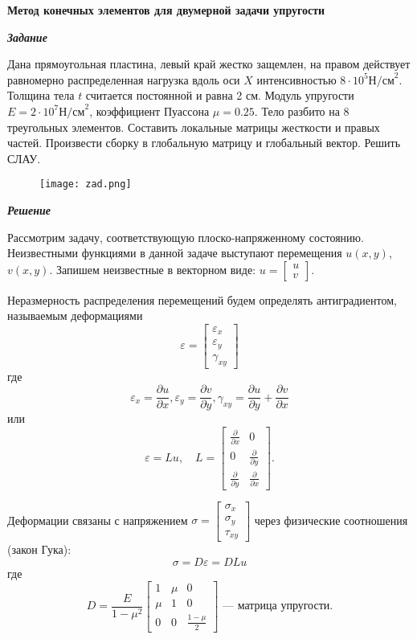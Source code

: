 \documentclass[a4paper, 12pt]{article}
\begin{document}
\begin{center}
	\textbf{Метод конечных элементов для двумерной задачи упругости}

	\textbf{\textit{Задание}}
\end{center}

Дана прямоугольная пластина, левый край жестко защемлен, на правом действует равномерно распределенная нагрузка вдоль оси $X$ интенсивностью  $8\cdot 10^5 \text{Н/см}^2$. Толщина тела $t$ считается постоянной и равна 2 см. Модуль упругости  $E=2\cdot 10^7 \text{Н/см}^2$, коэффициент Пуассона $\mu=0.25$. Тело разбито на 8 треугольных элементов. Составить локальные матрицы жесткости и правых частей. Произвести сборку в глобальную матрицу и глобальный вектор. Решить СЛАУ.

\begin{figure}[h]
	\centering
\texttt{[image: zad.png]}
\end{figure} 


\begin{center}
	\textit{\textbf{Решение}}
\end{center}

Рассмотрим задачу, соответствующую плоско-напряженному состоянию.  
Неизвестными функциями в данной задаче выступают перемещения \(u(x,y)\), \(v(x,y)\).  
Запишем неизвестные в векторном виде: \(u = \begin{bmatrix} u \\ v \end{bmatrix}\).

Неразмерность распределения перемещений будем определять антиградиентом, называемым деформациями 
\[
\varepsilon = \begin{bmatrix} \varepsilon_x \\ \varepsilon_y \\ \gamma_{xy} \end{bmatrix}
\]
где 
\[\varepsilon_x = \frac{\partial u}{\partial x}, \varepsilon_y = \frac{\partial v}{\partial y}, \gamma_{xy} = \frac{\partial u}{\partial y} + \frac{\partial v}{\partial x}
\]
или
\[
\varepsilon = L u, \quad L = 
\begin{bmatrix}
	\frac{\partial}{\partial x} & 0 \\
	0 & \frac{\partial}{\partial y} \\
	\frac{\partial}{\partial y} & \frac{\partial}{\partial x}
\end{bmatrix}.
\]

Деформации связаны с напряжением \(\sigma = \begin{bmatrix} \sigma_x \\ \sigma_y \\ \tau_{xy} \end{bmatrix}\) через физические соотношения (закон Гука): 
\[
\sigma = D \varepsilon = D L u
\]
где
\[
D = \frac{E}{1 - \mu^2}
\begin{bmatrix}
	1 & \mu & 0 \\
	\mu & 1 & 0 \\
	0 & 0 & \frac{1-\mu}{2}
\end{bmatrix}  \text{ — матрица упругости.}
\]
\end{document}
